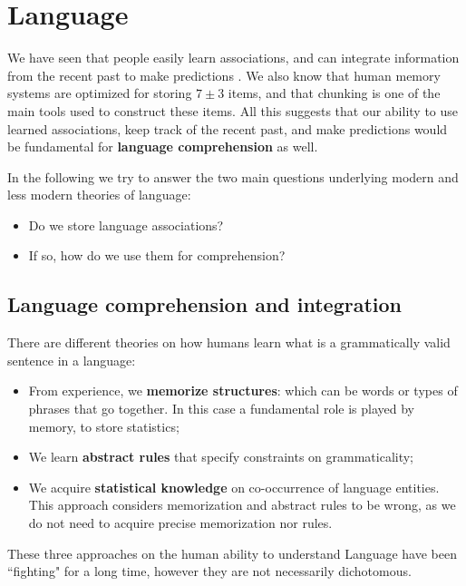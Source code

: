 \chapter{Language}
\label{chap:language}

We have seen that people easily learn associations, and can integrate information from the recent past to make predictions \notet. We also know that human memory systems are optimized for storing $7 \pm 3$ items, and that chunking is one of the main tools used to construct these items. All this suggests that our ability to use learned associations, keep track of the recent past, and make predictions would be fundamental for \textbf{language comprehension} as well.


In the following we try to answer the two main questions underlying modern and less modern theories of language:
\begin{itemize}
    \item Do we store language associations?
    \item If so, how do we use them for comprehension?
\end{itemize}

\section{Language comprehension and integration}
There are different theories on how humans learn what is a grammatically valid sentence in a language:
\begin{itemize}
    \item From experience, we \textbf{memorize structures}: which can be words or types of phrases that go together. In this case a fundamental role is played by memory, to store statistics;
    \item We learn \textbf{abstract rules} that specify constraints on grammaticality;
    \item We acquire \textbf{statistical knowledge} on co-occurrence of language entities. This approach considers memorization and abstract rules to be wrong, as we do not need to acquire precise memorization nor rules.
\end{itemize}
These three approaches on the human ability to understand Language have been ``fighting" for a long time, however they are not necessarily dichotomous.

